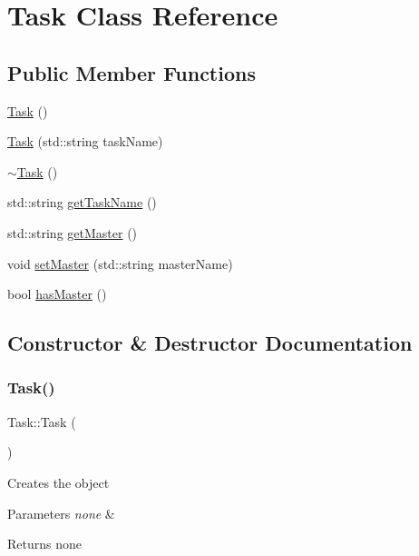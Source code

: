 \hypertarget{class_task}{}\section{Task Class Reference}
\label{class_task}
\subsection*{Public Member Functions}
\begin{DoxyCompactItemize}
\item 
\mbox{\hyperlink{class_task_a0ca53354bdc006762a0fda68c64f7608}{Task}} ()
\item 
\mbox{\hyperlink{class_task_a919462cb02c369ec510acee9783f383d}{Task}} (std\+::string task\+Name)
\item 
\mbox{\hyperlink{class_task_a3ecf499ea35fb4a96853969a1e1cbbce}{$\sim$\+Task}} ()
\item 
std\+::string \mbox{\hyperlink{class_task_abb5dae8b5244e54c7d5015b2e788d803}{get\+Task\+Name}} ()
\item 
std\+::string \mbox{\hyperlink{class_task_ac9ff345f85948cb8877be93a18096795}{get\+Master}} ()
\item 
void \mbox{\hyperlink{class_task_a3ffb8dc55564036408702006b64a5759}{set\+Master}} (std\+::string master\+Name)
\item 
bool \mbox{\hyperlink{class_task_a7a23a48a20e3381d22438a6657944a00}{has\+Master}} ()
\end{DoxyCompactItemize}


\subsection{Constructor \& Destructor Documentation}
\mbox{\label{class_task_a0ca53354bdc006762a0fda68c64f7608}} 
\subsubsection{\texorpdfstring{Task()}{Task()}\hspace{0.1cm}{\footnotesize\ttfamily [1/2]}}
{\footnotesize\ttfamily Task\+::\+Task (\begin{DoxyParamCaption}{ }\end{DoxyParamCaption})}

Creates the object 
\begin{DoxyParams}{Parameters}
{\em none} & \\
\hline
\end{DoxyParams}
\begin{DoxyReturn}{Returns}
none 
\end{DoxyReturn}
\mbox{\label{class_task_a919462cb02c369ec510acee9783f383d}} 
